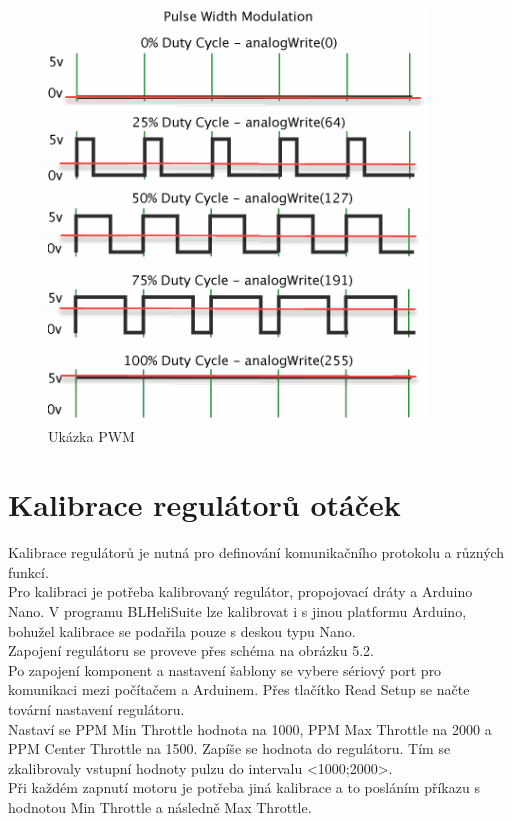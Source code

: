 \begin{figure}[h]
	\centering
	\includegraphics[width=10cm]{pictures/pwm.png}
	\caption{Ukázka PWM}
\end{figure}


\section{Kalibrace regulátorů otáček}
Kalibrace regulátorů je nutná pro definování komunikačního protokolu a různých funkcí.\\
Pro kalibraci je potřeba kalibrovaný regulátor, propojovací dráty a Arduino Nano. V programu BLHeliSuite lze kalibrovat i s jinou platformu Arduino, bohužel kalibrace se podařila pouze s deskou typu Nano.\\
Zapojení regulátoru se proveve přes schéma na obrázku 5.2.\\
Po zapojení komponent a nastavení šablony se vybere sériový port pro komunikaci mezi počítačem a Arduinem. Přes tlačítko Read Setup se načte tovární nastavení regulátoru.\\
Nastaví se PPM Min Throttle hodnota na 1000, PPM Max Throttle na 2000 a PPM Center Throttle na 1500. Zapíše se hodnota do regulátoru. Tím se zkalibrovaly vstupní hodnoty pulzu do intervalu <1000;2000>. \\
Při každém zapnutí motoru je potřeba jiná kalibrace a to posláním příkazu s hodnotou Min Throttle a následně Max Throttle.




